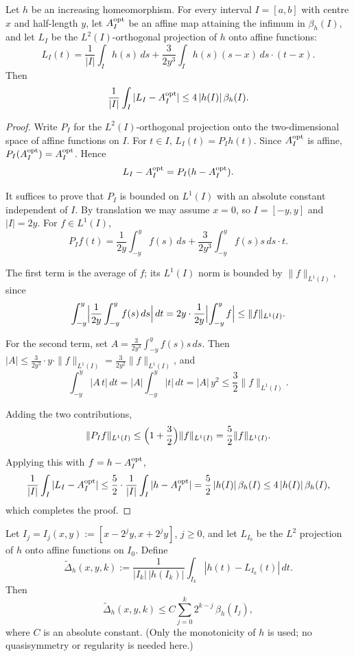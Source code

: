 \begin{lemma}[$L^2$--$L^1$ Comparison]\label{lem:L2-L1-comparison}
	\leanok
	Let $h$ be an increasing homeomorphism.
	For every interval $I=[a,b]$ with centre $x$ and half-length $y$, let
	$A_I^{\rm opt}$ be an affine map attaining the infimum in $\beta_h(I)$, and
	let $L_I$ be the $L^2(I)$-orthogonal projection of $h$ onto affine functions:
	\[
	L_I(t)=\frac1{|I|}\int_I h(s)\,ds+\frac{3}{2y^3}\int_I h(s)(s-x)\,ds\cdot(t-x).
	\]
	Then
	\[
	\frac1{|I|}\int_I|L_I-A_I^{\rm opt}|\le 4\,|h(I)|\,\beta_h(I).
	\]
\end{lemma}

\begin{proof}
	Write $P_I$ for the $L^2(I)$-orthogonal projection onto the two-dimensional
	space of affine functions on $I$.  For $t\in I$, $L_I(t)=P_I h(t)$.
	Since $A_I^{\rm opt}$ is affine, $P_I(A_I^{\rm opt})=A_I^{\rm opt}$.  Hence
	\[
	L_I-A_I^{\rm opt}=P_I(h-A_I^{\rm opt}).
	\]
	
	It suffices to prove that $P_I$ is bounded on $L^1(I)$ with an
	absolute constant independent of $I$.  By translation we may assume
	$x=0$, so $I=[-y,y]$ and $|I|=2y$.
	For $f\in L^1(I)$,
	\[
	P_I f(t)=\frac1{2y}\int_{-y}^{y}f(s)\,ds
	+\frac{3}{2y^3}\int_{-y}^{y}f(s)s\,ds\cdot t .
	\]
	
	The first term is the average of $f$; its $L^1(I)$ norm is bounded by
	$\|f\|_{L^1(I)}$, since
	\[
	\int_{-y}^{y}\Bigl|\frac1{2y}\int_{-y}^{y}f(s)\,ds\Bigr|\,dt
	=2y\cdot\frac1{2y}\Bigl|\int_{-y}^{y}f\Bigr|
	\le\|f\|_{L^1(I)} .
	\]
	
	For the second term, set $A=\frac{3}{2y^3}\int_{-y}^{y}f(s)s\,ds$.
	Then $|A|\le\frac{3}{2y^3}\cdot y\cdot\|f\|_{L^1(I)}
	=\frac{3}{2y^2}\|f\|_{L^1(I)}$,
	and
	\[
	\int_{-y}^{y}|A\,t|\,dt
	=|A|\int_{-y}^{y}|t|\,dt
	=|A|\,y^2
	\le\frac{3}{2}\|f\|_{L^1(I)} .
	\]
	
	Adding the two contributions,
	\[
	\|P_I f\|_{L^1(I)}\le\Bigl(1+\frac{3}{2}\Bigr)\|f\|_{L^1(I)}
	=\frac{5}{2}\|f\|_{L^1(I)} .
	\]
	
	Applying this with $f=h-A_I^{\rm opt}$,
	\[
	\frac1{|I|}\int_I|L_I-A_I^{\rm opt}|
	\le\frac{5}{2}\cdot\frac1{|I|}\int_I|h-A_I^{\rm opt}|
	=\frac{5}{2}\,|h(I)|\,\beta_h(I)
	\le 4\,|h(I)|\,\beta_h(I),
	\]
	which completes the proof.
\end{proof}

\begin{lemma}\label{lem:delta-beta-new}
	\leanok
	Let $I_j=I_j(x,y):=[x-2^jy,x+2^jy]$, $j\ge0$, and let $L_{I_0}$ be the $L^2$ projection of $h$ onto affine functions on $I_0$. Define
	\[
	\widetilde\Delta_h(x,y,k):=\frac{1}{|I_k|\,|h(I_k)|}\int_{I_k}|h(t)-L_{I_0}(t)|\,dt.
	\]
	Then
	\[
	\widetilde\Delta_h(x,y,k)\le C\sum_{j=0}^k 2^{k-j}\,\beta_h(I_j),
	\]
	where $C$ is an absolute constant. (Only the monotonicity of $h$ is used; no
	quasisymmetry or regularity is needed here.)
\end{lemma}


